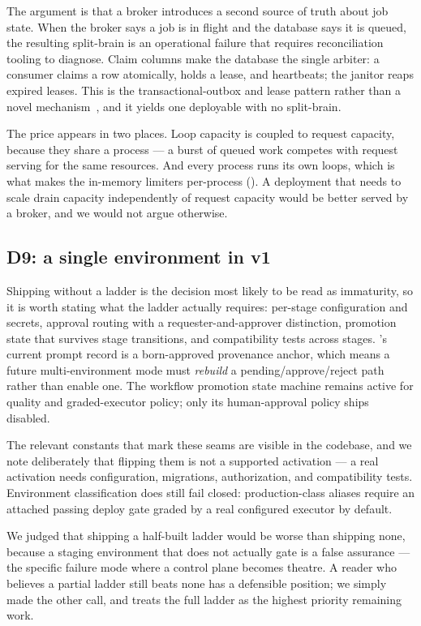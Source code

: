The argument is that a broker introduces a second source of truth about job state.
When the broker says a job is in flight and the database says it is queued, the
resulting split-brain is an operational failure that requires reconciliation
tooling to diagnose. Claim columns make the database the single arbiter: a consumer
claims a row atomically, holds a lease, and heartbeats; the janitor reaps expired
leases. This is the transactional-outbox and lease pattern rather than a novel
mechanism~\cite{kleppmann2017ddia}, and it yields one deployable with no
split-brain.

The price appears in two places. Loop capacity is coupled to request capacity,
because they share a process --- a burst of queued work competes with request
serving for the same resources. And every process runs its own loops, which is what
makes the in-memory limiters per-process (). A deployment that
needs to scale drain capacity independently of request capacity would be better
served by a broker, and we would not argue otherwise.

\subsection{D9: a single environment in v1}

Shipping without a \arrowto{}\arrowto{} ladder is the
decision most likely to be read as immaturity, so it is worth stating what the
ladder actually requires: per-stage configuration and secrets, approval routing with
a requester-and-approver distinction, promotion state that survives stage
transitions, and compatibility tests across stages. \sys's current prompt record is a
born-approved provenance anchor, which means a future multi-environment mode must
\emph{rebuild} a pending/approve/reject path rather than enable one. The workflow
promotion state machine remains active for quality and graded-executor policy; only
its human-approval policy ships disabled.

The relevant constants that mark these seams are visible in the codebase, and we
note deliberately that flipping them is not a supported activation --- a real
activation needs configuration, migrations, authorization, and compatibility tests.
Environment classification does still fail closed: production-class aliases require
an attached passing deploy gate graded by a real configured executor by default.

We judged that shipping a half-built ladder would be worse than shipping none,
because a staging environment that does not actually gate is a false assurance ---
the specific failure mode where a control plane becomes theatre. A reader who
believes a partial ladder still beats none has a defensible position; we simply
made the other call, and  treats the full ladder as the highest
priority remaining work.

